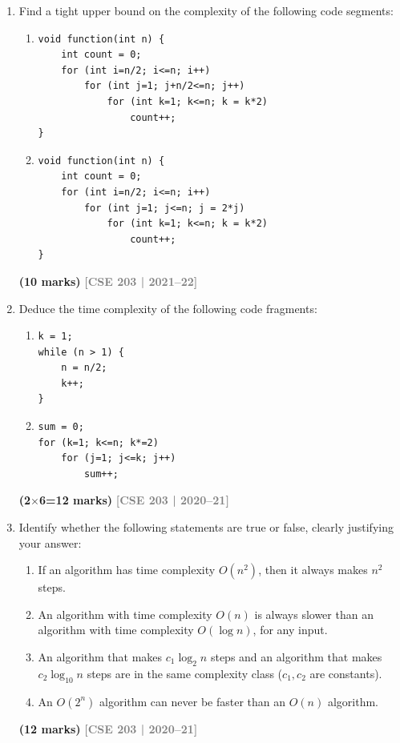 \documentclass[12pt,a3paper]{article}
\newcommand{\yr}[1]{\hfill\textcolor{gray}{\small\textbf{[#1]}}}
\newcommand{\mk}[1]{\textcolor{orange!70!black}{\small\textbf{(#1 marks)}}}
\begin{document}
\begin{enumerate}
\begin{center}
\end{center}

\vspace{0.5cm}

\item Find a tight upper bound on the complexity of the following code segments:
\begin{enumerate}
  \item \begin{verbatim}
void function(int n) {
    int count = 0;
    for (int i=n/2; i<=n; i++)
        for (int j=1; j+n/2<=n; j++)
            for (int k=1; k<=n; k = k*2)
                count++;
}
\end{verbatim}
  \item \begin{verbatim}
void function(int n) {
    int count = 0;
    for (int i=n/2; i<=n; i++)
        for (int j=1; j<=n; j = 2*j)
            for (int k=1; k<=n; k = k*2)
                count++;
}
\end{verbatim}
\end{enumerate}
\mk{10}
\yr{CSE 203 | 2021--22}

\item Deduce the time complexity of the following code fragments:
\begin{enumerate}
  \item \begin{verbatim}
k = 1;
while (n > 1) {
    n = n/2;
    k++;
}
\end{verbatim}
  \item \begin{verbatim}
sum = 0;
for (k=1; k<=n; k*=2)
    for (j=1; j<=k; j++)
        sum++;
\end{verbatim}
\end{enumerate}
\mk{2$\times$6=12}
\yr{CSE 203 | 2020--21}

\item Identify whether the following statements are true or false, clearly justifying your answer:
\begin{enumerate}
  \item If an algorithm has time complexity $O(n^2)$, then it always makes $n^2$ steps.
  \item An algorithm with time complexity $O(n)$ is always slower than an algorithm with time complexity $O(\log n)$, for any input.
  \item An algorithm that makes $c_1 \log_2 n$ steps and an algorithm that makes $c_2 \log_{10} n$ steps are in the same complexity class ($c_1, c_2$ are constants).
  \item An $O(2^n)$ algorithm can never be faster than an $O(n)$ algorithm.
\end{enumerate}
\mk{12}
\yr{CSE 203 | 2020--21}


\end{enumerate}
\end{document}
